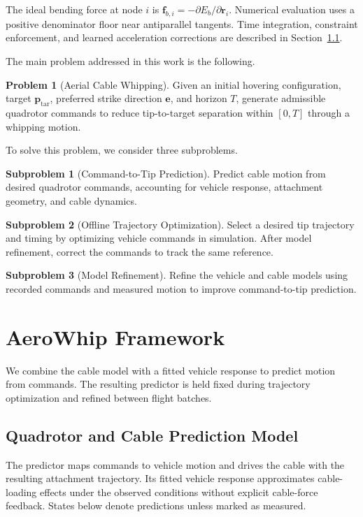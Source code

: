\documentclass[letterpaper, 10 pt, conference]{ieeeconf}
\begin{document}
The ideal bending force at node $i$ is
$\mathbf f_{b,i}=-\partial E_b/\partial\mathbf r_i$.
Numerical evaluation uses a positive denominator floor near
antiparallel tangents.
Time integration, constraint enforcement, and learned
acceleration corrections are described in
Section~\ref{subsec:prediction_model}.

The main problem addressed in this work is the following.

\noindent\textbf{Problem 1} (Aerial Cable Whipping).
Given an initial hovering configuration, target
$\mathbf p_{\mathrm{tar}}$, preferred strike direction $\mathbf e$,
and horizon $T$, generate admissible quadrotor commands to reduce
tip-to-target separation within $[0,T]$ through a whipping motion.

To solve this problem, we consider three subproblems.

\noindent\textbf{Subproblem 1} (Command-to-Tip Prediction).
Predict cable motion from desired quadrotor commands,
accounting for vehicle response, attachment geometry, and cable
dynamics.

\noindent\textbf{Subproblem 2} (Offline Trajectory Optimization).
Select a desired tip trajectory and timing by optimizing
vehicle commands in simulation. After model refinement, correct
the commands to track the same reference.

\noindent\textbf{Subproblem 3} (Model Refinement).
Refine the vehicle and cable models using recorded commands
and measured motion to improve command-to-tip prediction.

\section{AeroWhip Framework}
\label{sec:aerowhip_framework}

We combine the cable model with a fitted vehicle response to
predict motion from commands. The resulting predictor is held
fixed during trajectory optimization and refined between flight
batches.

\subsection{Quadrotor and Cable Prediction Model}
\label{subsec:prediction_model}

The predictor maps commands to vehicle motion and drives the cable
with the resulting attachment trajectory. Its fitted vehicle
response approximates cable-loading effects under the observed
conditions without explicit cable-force feedback. States below
denote predictions unless marked as measured.
\end{document}
